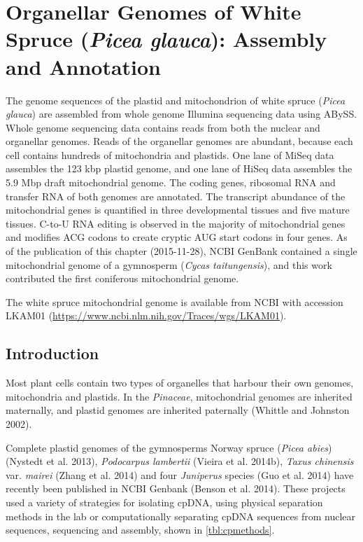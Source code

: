 \documentclass[
  12pt,
  oneside,
  openany]{book}
\begin{document}
\hypertarget{organellar-genomes-of-white-spruce-picea-glauca-assembly-and-annotation}{%
\chapter{\texorpdfstring{Organellar Genomes of White Spruce (\emph{Picea glauca}): Assembly and Annotation}{Organellar Genomes of White Spruce (Picea glauca): Assembly and Annotation}}\label{organellar-genomes-of-white-spruce-picea-glauca-assembly-and-annotation}}


The genome sequences of the plastid and mitochondrion of white spruce (\emph{Picea glauca}) are assembled from whole genome Illumina sequencing data using ABySS. Whole genome sequencing data contains reads from both the nuclear and organellar genomes. Reads of the organellar genomes are abundant, because each cell contains hundreds of mitochondria and plastids. One lane of MiSeq data assembles the 123 kbp plastid genome, and one lane of HiSeq data assembles the 5.9 Mbp draft mitochondrial genome. The coding genes, ribosomal RNA and transfer RNA of both genomes are annotated. The transcript abundance of the mitochondrial genes is quantified in three developmental tissues and five mature tissues. C-to-U RNA editing is observed in the majority of mitochondrial genes and modifies ACG codons to create cryptic AUG start codons in four genes. As of the publication of this chapter (2015-11-28), NCBI GenBank contained a single mitochondrial genome of a gymnosperm (\emph{Cycas taitungensis}), and this work contributed the first coniferous mitochondrial genome.

The white spruce mitochondrial genome is available from NCBI with accession LKAM01 (\url{https://www.ncbi.nlm.nih.gov/Traces/wgs/LKAM01}).

\hypertarget{introduction-4}{%
\section{Introduction}\label{introduction-4}}

Most plant cells contain two types of organelles that harbour their own genomes, mitochondria and plastids. In the \emph{Pinaceae}, mitochondrial genomes are inherited maternally, and plastid genomes are inherited paternally (Whittle and Johnston 2002).

Complete plastid genomes of the gymnosperms Norway spruce (\emph{Picea abies}) (Nystedt et al. 2013), \emph{Podocarpus lambertii} (Vieira et al. 2014b), \emph{Taxus chinensis} var. \emph{mairei} (Zhang et al. 2014) and four \emph{Juniperus} species (Guo et al. 2014) have recently been published in NCBI Genbank (Benson et al. 2014). These projects used a variety of strategies for isolating cpDNA, using physical separation methods in the lab or computationally separating cpDNA sequences from nuclear sequences, sequencing and assembly, shown in \cref{tbl:cpmethods}.
\end{document}
